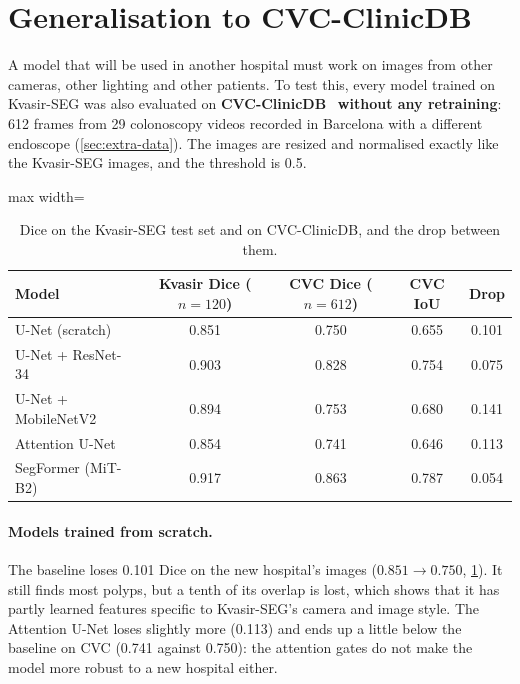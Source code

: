 \section{Generalisation to CVC-ClinicDB}
\label{sec:gen}
A model that will be used in another hospital must work on images from other cameras, other lighting and other
patients. To test this, every model trained on Kvasir-SEG was also evaluated on \textbf{CVC-ClinicDB}~\cite{bernal2015cvc}
\textbf{without any retraining}: 612 frames from 29 colonoscopy videos recorded in Barcelona with a different
endoscope (\cref{sec:extra-data}). The images are resized and normalised exactly like the Kvasir-SEG images, and the
threshold is 0.5.

\begin{table}[t]
  \centering
  \small
  \setlength{\tabcolsep}{3pt}
  \begin{adjustbox}{max width=\linewidth}
  \begin{tabular}{@{}lcccc@{}}
    \toprule
    Model & Kvasir Dice ($n{=}120$) & CVC Dice ($n{=}612$) & CVC IoU & Drop \\
    \midrule
    U-Net (scratch)     & 0.851 & 0.750 & 0.655 & 0.101 \\
    U-Net + ResNet-34   & 0.903 & 0.828 & 0.754 & 0.075 \\
    U-Net + MobileNetV2 & 0.894 & 0.753 & 0.680 & 0.141 \\
    Attention U-Net     & 0.854 & 0.741 & 0.646 & 0.113 \\
    SegFormer (MiT-B2)  & 0.917 & 0.863 & 0.787 & 0.054 \\
    \bottomrule
  \end{tabular}
  \end{adjustbox}
  \caption{Dice on the Kvasir-SEG test set and on CVC-ClinicDB, and the drop between them.}
  \label{tab:cvc}
\end{table}

\paragraph{Models trained from scratch.} The baseline loses 0.101 Dice on the new hospital's images ($0.851 \rightarrow 0.750$, \cref{tab:cvc}). It
still finds most polyps, but a tenth of its overlap is lost, which shows that it has partly learned features
specific to Kvasir-SEG's camera and image style. The Attention U-Net loses slightly more (0.113) and ends up a
little below the baseline on CVC (0.741 against 0.750): the attention gates do not make the model more robust
to a new hospital either.

